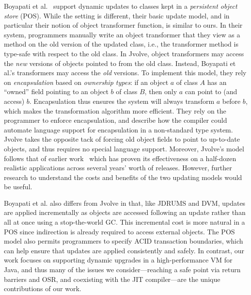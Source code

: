 \documentclass[9pt]{sigplanconf}
\newcommand{\DSU}{{\sc Jvolve}}
\begin{document}


Boyapati et al.~\cite{boyapati03lazy} support dynamic updates to
classes kept in a \emph{persistent object store} (POS).  While the
setting is different, their basic update model, and in particular
their notion of object transformer function, is similar to ours.  In
their system, programmers manually write an object transformer
that they view as a method on the old version of the updated class, i.e., the transformer method is type-safe with respect to the old class.
In \DSU, object transformers may access the \emph{new} versions of
objects pointed to from the old class.  Instead, Boyapati et al.'s
transformers may access the \emph{old} versions.  To implement this
model, they rely on
\emph{encapsulation} based on \emph{ownership types}: if an object $a$ of class $A$ has an ``owned''
field pointing to an object $b$ of class $B$, then only $a$ can point
to (and access) $b$.  Encapsulation thus ensures the system will always transform $a$ before $b$, which makes the transformation
algorithm more efficient.  They rely on the programmer to 
enforce encapsulation, and describe how the compiler could automate language support for encapsulation in a non-standard type system.  
\DSU{} takes the opposite tack of forcing old object fields to point
to up-to-date objects, and thus requires no special language support.
Moreover, \DSU's model follows that of earlier
work~\cite{k42usenix,neamtiu06dsu,neamtiu09stump,upstare} which has
proven its effectiveness on a half-dozen realistic applications
across several years' worth of releases.  However, further
research to understand the costs and benefits of the two updating
models would be useful.

Boyapati et al. also differs from \DSU{} in that, like JDRUMS and DVM,
updates are applied incrementally as objects are accessed following
an update rather than all at once using a stop-the-world GC\@.  This
incremental cost is more natural in a POS since indirection is
already required to access external objects.  The POS model also
permits programmers to specify ACID transaction boundaries, which can
help ensure that updates are applied consistently and safely.  In contrast, our work focuses on 
supporting dynamic upgrades in a high-performance VM for Java, and thus many of
the issues we consider---reaching a safe point via return barriers and
OSR, and coexisting with the JIT compiler---are the unique
contributions of our work.
\end{document}
